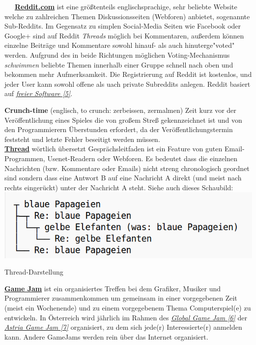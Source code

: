 ~~~\href{http://reddit.com}{\textbf{Reddit.com}} ist eine größtenteils englischsprachige, sehr beliebte Website welche zu zahlreichen Themen Diskussionsseiten (Webforen) anbietet, sogenannte Sub-Reddits. Im Gegensatz zu simplen Social-Media Seiten wie Facebook oder Google+ sind auf Reddit \textit{Threads} möglich bei Kommentaren, außerdem können einzelne Beiträge und Kommentare sowohl hinauf- als auch hinuterge"voted" werden. Aufgrund des in beide Richtungen möglichen Voting-Mechanismus \textit{schwimmen} beliebte Themen innerhalb einer Gruppe schnell nach oben und bekommen mehr Aufmerksamkeit. Die Registrierung auf Reddit ist kostenlos, und jeder User kann sowohl offene als uach private Subreddits anlegen. Reddit basiert auf \href{http://github.com/reddit/}{\textit{freier Software [5]}}.

\textbf{Crunch-time} (englisch, to crunch: zerbeissen, zermalmen) Zeit kurz vor der Veröffentlichung eines Spieles die von großem Streß gekennzeichnet ist und von den Programmierern Überstunden erfordert, da der Veröffentlichungstermin feststeht und letzte Fehler beseitigt werden müssen.\\

\href{http://de.wikipedia.org/wiki/Thread_(Internet)}{\textbf{Thread}} wörtlich übersetzt Gesprächsleitfaden ist ein Feature von guten Email-Programmen, Usenet-Readern oder Webforen. Es bedeutet dass die einzelnen Nachrichten (bzw. Kommentare oder Emails) nicht streng chronologisch geordnet sind sondern dass eine Antwort B auf eine Nachricht A direkt (und meist nach rechts eingerückt) unter der Nachricht A steht. Siehe auch dieses Schaubild:
\includegraphics[width=\linewidth]{redditrant/redditrant-threads.png} \\
\begin{center}
\footnotesize{Thread-Darstellung}
\end{center}

\href{https://en.wikipedia.org/wiki/Game_jam}{\textbf{Game Jam}} ist ein organisiertes Treffen bei dem Grafiker, Musiker und Programmierer zusammenkommen um gemeinsam in einer vorgegebenen Zeit (meist ein Wochenende) und zu einem vorgegebenem Thema Computerspiel(e) zu entwickeln. In Österreich wird jährlich im Rahmen des \href{http://globalgamejam.org/}{\textit{Global Game Jam [6]}} der \href{http://austriagamejam.org/}{\textit{Astria Game Jam [7]}} organisiert, zu dem sich jede(r) Interessierte(r) anmelden kann. Andere GameJams werden rein über das Internet organisiert. 


